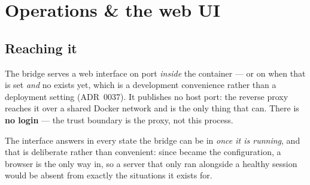 \chapter{Operations \& the web UI}
\label{ch:ops}

\section{Reaching it}
\label{sec:screens}

The bridge serves a web interface on port  \emph{inside} the container --- or on
 when that is set \emph{and} no  exists yet, which is a
development convenience rather than a deployment setting (ADR~0037). It
publishes no host port: the reverse proxy reaches it over a shared Docker network and is the
only thing that can. There is \textbf{no login} --- the trust boundary is the proxy, not this
process.

The interface answers in every state the bridge can be in \emph{once it is running}, and that
is deliberate rather than convenient: since  became the configuration, a
browser is the only way in, so a server that only ran alongside a healthy session would be
absent from exactly the situations it exists for.


